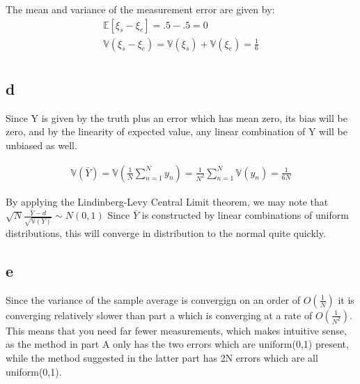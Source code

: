 \documentclass[11pt]{article}\usepackage[]{graphicx}\usepackage[]{color}
\begin{document}
The mean and variance of the measurement error are given by: 
\begin{align*}
\mathbb{E}[ \xi_s - \xi_e ] = .5 - .5 = 0 \\
\mathbb{V}( \xi_s - \xi_e ) = \mathbb{V}( \xi_s ) + \mathbb{V}( \xi_e ) = \frac{1}{6} \\
\end{align*}

\subsection{d}
\label{sec-1-4}

Since Y is given by the truth plus an error which has mean zero, its
bias will be zero, and by the linearity of expected value, any linear
combination of Y will be unbiased as well.

\begin{align*}
\mathbb{V}(\bar{Y}) = \mathbb{V}( \frac{1}{N} \sum_{n=1}^N y_n ) = \frac{1}{N^2} \sum_{n=1}^N \mathbb{V}( y_n ) = \frac{1}{6N}
\end{align*}

By applying the Lindinberg-Levy Central Limit theorem, we may note
that $\sqrt{N} \frac{ \bar{Y} - d }{ \sqrt{ \mathbb{V}(Y) } } \sim
N(0,1)$ Since $\bar{Y}$ is constructed by linear combinations of
uniform distributions, this will converge in distribution to the
normal quite quickly.

\subsection{e}
\label{sec-1-5}
Since the variance of the sample average is convergign on an order of
$O( \frac{1}{N} )$ it is converging relatively slower than part a which
is converging at a rate of $O( \frac{1}{N^2} )$. This means that you need
far fewer measurements, which makes intuitive sense, as the method in
part A only has the two errors which are uniform(0,1) present, while
the method suggested in the latter part has 2N errors which are all
uniform(0,1).
\end{document}
